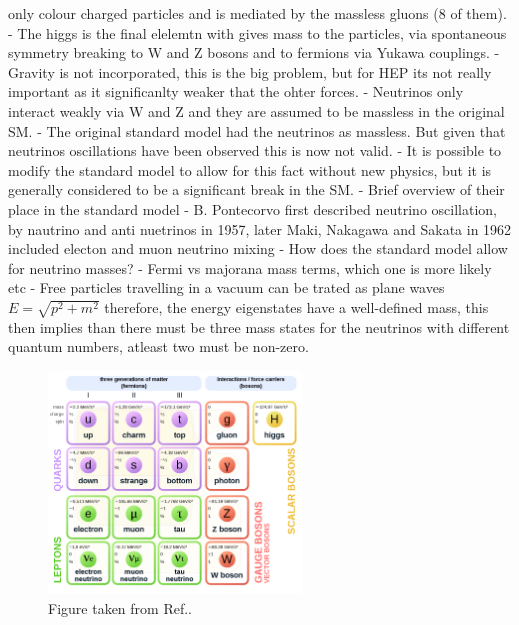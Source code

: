 only colour charged particles and is mediated by the massless gluons (8 of them).
- The higgs is the final elelemtn with gives mass to the particles, via spontaneous symmetry
breaking to W and Z bosons and to fermions via Yukawa couplings.
- Gravity is not incorporated, this is the big problem, but for HEP its not really important as
it significanlty weaker that the ohter forces.
- Neutrinos only interact weakly via W and Z and they are assumed to be massless in the original
SM.
- The original standard model had the neutrinos as massless. But given that neutrinos oscillations
have been observed this is now not valid.
- It is possible to modify the standard model to allow for this fact without new physics, but it
is generally considered to be a significant break in the SM.
- Brief overview of their place in the standard model
- B. Pontecorvo first described neutrino oscillation, by nautrino and anti nuetrinos in 1957,
later Maki, Nakagawa and Sakata in 1962 included electon and muon neutrino mixing
- How does the standard model allow for neutrino masses?
- Fermi vs majorana mass terms, which one is more likely etc
- Free particles travelling in a vacuum can be trated as plane waves $E=\sqrt{p^2+m^2}$ therefore,
the energy eigenstates have a well-defined mass,
this then implies than there must be three mass states for the neutrinos with different quantum
numbers, atleast two must be non-zero.

\begin{figure} %
    \includegraphics[origin=c,width=0.6\textwidth]{diagrams/3-theory/sm.png}
    \caption[sm short]
    {Figure taken from Ref.\cite{wiki2020}.}
    \label{fig:sm}
\end{figure} %

